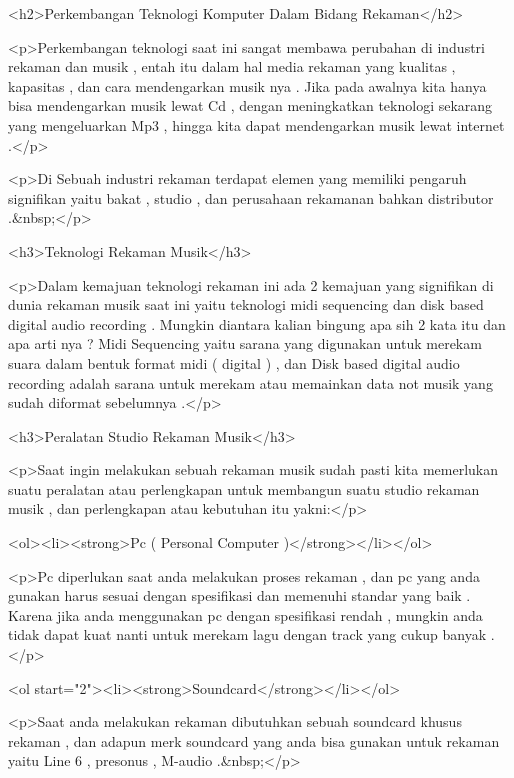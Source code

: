 <h2>Perkembangan Teknologi Komputer Dalam Bidang Rekaman</h2>



<p>Perkembangan teknologi saat ini sangat membawa perubahan di industri rekaman dan musik , entah itu dalam hal media rekaman yang kualitas , kapasitas , dan cara mendengarkan musik nya . Jika pada awalnya kita hanya bisa mendengarkan musik lewat Cd , dengan meningkatkan teknologi sekarang yang mengeluarkan Mp3 , hingga kita dapat mendengarkan musik lewat internet .</p>



<p>Di Sebuah industri rekaman terdapat elemen yang memiliki pengaruh signifikan yaitu bakat , studio , dan perusahaan rekamanan bahkan distributor .&nbsp;</p>



<h3>Teknologi Rekaman Musik</h3>



<p>Dalam kemajuan teknologi rekaman ini ada 2 kemajuan yang signifikan di dunia rekaman musik saat ini yaitu teknologi midi sequencing dan disk based digital audio recording . Mungkin diantara kalian bingung apa sih 2 kata itu dan apa arti nya ? Midi Sequencing yaitu sarana yang digunakan untuk merekam suara dalam bentuk format midi ( digital ) , dan Disk based digital audio recording adalah sarana untuk merekam atau memainkan data not musik yang sudah diformat sebelumnya .</p>



<h3>Peralatan Studio Rekaman Musik</h3>



<p>Saat ingin melakukan sebuah rekaman musik sudah pasti kita memerlukan suatu peralatan atau perlengkapan untuk membangun suatu studio rekaman musik , dan perlengkapan atau kebutuhan itu yakni:</p>



<ol><li><strong>Pc ( Personal Computer )</strong></li></ol>



<p>Pc diperlukan saat anda melakukan proses rekaman , dan pc yang anda gunakan harus sesuai dengan spesifikasi dan memenuhi standar yang baik . Karena jika anda menggunakan pc dengan spesifikasi rendah , mungkin anda tidak dapat kuat nanti untuk merekam lagu dengan track yang cukup banyak .</p>



<ol start="2"><li><strong>Soundcard</strong></li></ol>



<p>Saat anda melakukan rekaman dibutuhkan sebuah soundcard khusus rekaman , dan adapun merk soundcard yang anda bisa gunakan untuk rekaman yaitu Line 6 , presonus , M-audio .&nbsp;</p>



